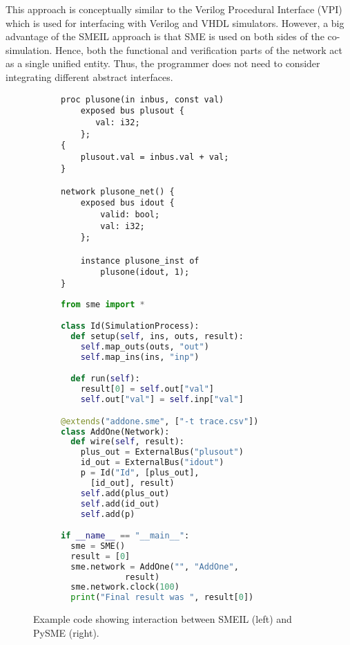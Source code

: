 This approach is conceptually similar to the Verilog Procedural Interface
(VPI)~\cite{dawson1996verilog} which is used for interfacing with Verilog and
VHDL simulators. However, a big advantage of the SMEIL approach is that SME is
used on both sides of the co-simulation. Hence, both the functional and
verification parts of the network act as a single unified entity. Thus, the
programmer does not need to consider integrating different abstract interfaces.


\begin{figure}
  \centerfloat
  \begin{subfigure}[t]{0.40\paperwidth}
\begin{lstlisting}[language=smeil]
proc plusone(in inbus, const val)
    exposed bus plusout {
       val: i32;
    };
{
    plusout.val = inbus.val + val;
}

network plusone_net() {
    exposed bus idout {
        valid: bool;
        val: i32;
    };

    instance plusone_inst of
        plusone(idout, 1);
}
\end{lstlisting}
    
  \end{subfigure}
  \begin{subfigure}[t]{0.40\paperwidth}
    \begin{lstlisting}[language=python]
from sme import *

class Id(SimulationProcess):
  def setup(self, ins, outs, result):
    self.map_outs(outs, "out")
    self.map_ins(ins, "inp")

  def run(self):
    result[0] = self.out["val"]
    self.out["val"] = self.inp["val"]

@extends("addone.sme", ["-t trace.csv"])
class AddOne(Network):
  def wire(self, result):
    plus_out = ExternalBus("plusout")
    id_out = ExternalBus("idout")
    p = Id("Id", [plus_out],
      [id_out], result)
    self.add(plus_out)
    self.add(id_out)
    self.add(p)

if __name__ == "__main__":
  sme = SME()
  result = [0]
  sme.network = AddOne("", "AddOne",
             result)
  sme.network.clock(100)
  print("Final result was ", result[0])
  \end{lstlisting}
  \end{subfigure}

  \caption{Example code showing interaction between SMEIL (left) and PySME
    (right).}
\label{fig:smeilpy}
\end{figure}

